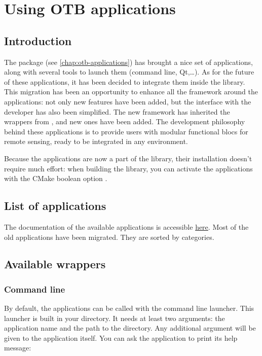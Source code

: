 \chapter{Using OTB applications}\label{chap:WrappedApplications}

\section{Introduction}\label{sec:wrappedAppliIntro}
The \app package (see \ref{chap:otb-applications}) has brought a nice set of 
applications, along with several tools to launch them (command line, Qt,\dots).
As for the future of these applications, it has been decided to integrate 
them inside the \otb library. This migration has been an opportunity to 
enhance all the framework around the applications: not only new features have
 been added, but the interface with the developer has also been simplified. 
The new framework has inherited the wrappers from \app, and new ones have been
added. The development philosophy behind these applications is to provide users 
with modular functional blocs for remote sensing, ready to be integrated in any
environment. 

Because the applications are now a part of the library, their installation doesn't
require much effort: when building the \otb library, you can activate the applications 
with the CMake boolean option .

\section{List of applications}\label{sec:wrappedAppliList}
The documentation of the available applications is accessible 
\href{http://orfeo-toolbox.org/Applications}{here}. Most of the old applications have
been migrated. They are sorted by categories.

\section{Available wrappers}\label{sec:wrappedAppliWrappers}

\subsection{Command line}\label{sec:wrappedAppliCmdLine}
By default, the applications can be called with the command line launcher. This launcher
is built in your  directory. It needs at least two arguments: the 
application name and the path to the  directory. Any additional argument
will be given to the application itself. You can ask the application to print its help
message:

